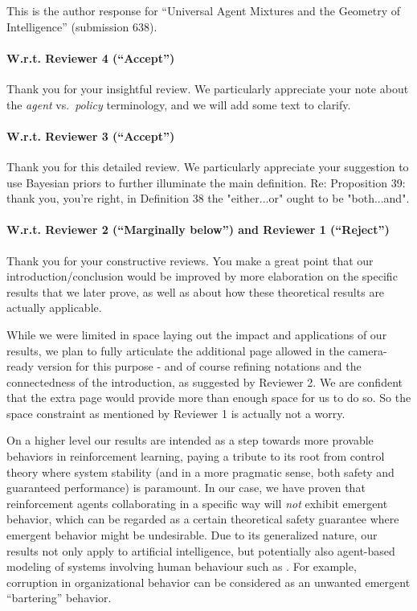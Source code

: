 \documentclass{article}
\begin{document}
This is the author response for ``Universal Agent Mixtures and the Geometry of Intelligence''
(submission 638).

\paragraph{W.r.t. Reviewer 4 (``Accept'')}

Thank you for your insightful review. We particularly appreciate your note about the \emph{agent} vs.\ \emph{policy} terminology, and we will add some text to clarify.

\paragraph{W.r.t. Reviewer 3 (``Accept'')}

Thank you for this detailed review. We particularly appreciate your suggestion to use Bayesian priors to further illuminate the main definition. Re: Proposition 39: thank you, you're right, in Definition 38 the "either...or" ought to be "both...and".

\paragraph{W.r.t. Reviewer 2 (``Marginally below'') and Reviewer 1 (``Reject'')}

Thank you for your constructive reviews. You make a great point that our introduction/conclusion would
be improved by more elaboration on the specific results that we later prove, as well as
about how these theoretical results are actually applicable.

While we were limited in space laying out the impact and
applications
of our results, we plan to fully articulate the additional page
allowed in the camera-ready version for this purpose - and of course refining notations and the connectedness of the introduction, as suggested by Reviewer 2.
We are confident that the extra page would provide more than enough space for us to do so. So the space constraint as mentioned by Reviewer 1 is actually not a worry.

On a higher level our results are intended as a step towards more provable behaviors in reinforcement learning,
paying a tribute to its root from control theory where system stability (and in a more pragmatic sense,
both safety and guaranteed performance)
is paramount.
In our case, we have proven that reinforcement agents collaborating
in a specific way will \emph{not} exhibit emergent behavior, which
can be regarded as a certain theoretical safety guarantee where emergent behavior might be undesirable.
Due to its generalized nature, our results not only apply to artificial intelligence,
but potentially also agent-based modeling of
systems involving human behaviour such as \cite{Bouarfa2013AgentbasedMA}.
For example, corruption in organizational behavior can be considered as an unwanted emergent ``bartering'' behavior. 
\end{document}
